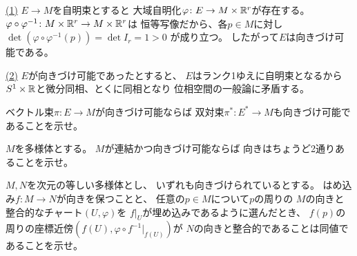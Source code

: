 \documentclass[report]{jlreq}
\begin{document}
\begin{answer}
    \uline{(1)} \quad
    $E \to M$を自明束とすると
    大域自明化$\varphi \colon E \to M \times \mathbb{R}^r$が存在する。
    $\varphi \circ \varphi^{-1} \colon M \times \mathbb{R}^r \to M \times \mathbb{R}^r$は
    恒等写像だから、各$p \in M$に対し
    $\det (\varphi \circ \varphi^{-1}(p)) = \det I_r = 1 > 0$
    が成り立つ。
    したがって$E$は向きづけ可能である。

    \uline{(2)} \quad
    $E$が向きづけ可能であったとすると、
    $E$はランク1ゆえに自明束となるから
    $S^1 \times \mathbb{R}$と微分同相、とくに同相となり
    位相空間の一般論に矛盾する。
\end{answer}

\begin{problem}[幾何学III 問4.1.7]
    ベクトル束$\pi \colon E \to M$が向きづけ可能ならば
    双対束$\pi^* \colon E^* \to M$も向きづけ可能であることを示せ。
\end{problem}

\begin{answer}
    \TODO{}
\end{answer}

\begin{problem}[幾何学III 問5.2.6]
    $M$を多様体とする。
    $M$が連結かつ向きづけ可能ならば
    向きはちょうど2通りあることを示せ。
\end{problem}

\begin{answer}
    \TODO{}
\end{answer}

\begin{problem}
    $M, N$を次元の等しい多様体とし、
    いずれも向きづけられているとする。
    はめ込み$f \colon M \to N$が向きを保つことと、
    任意の$p \in M$について$p$の周りの
    $M$の向きと整合的なチャート$(U, \varphi)$を
    $f|_U$が埋め込みであるように選んだとき、
    $f(p)$の周りの座標近傍$(f(U), \varphi \circ f^{-1}|_{f(U)})$が
    $N$の向きと整合的であることは同値であることを示せ。
\end{problem}
\end{document}
